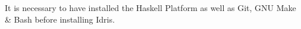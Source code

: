 It is necessary to have installed the Haskell Platform as well as Git, GNU Make \& Bash before installing Idris.
